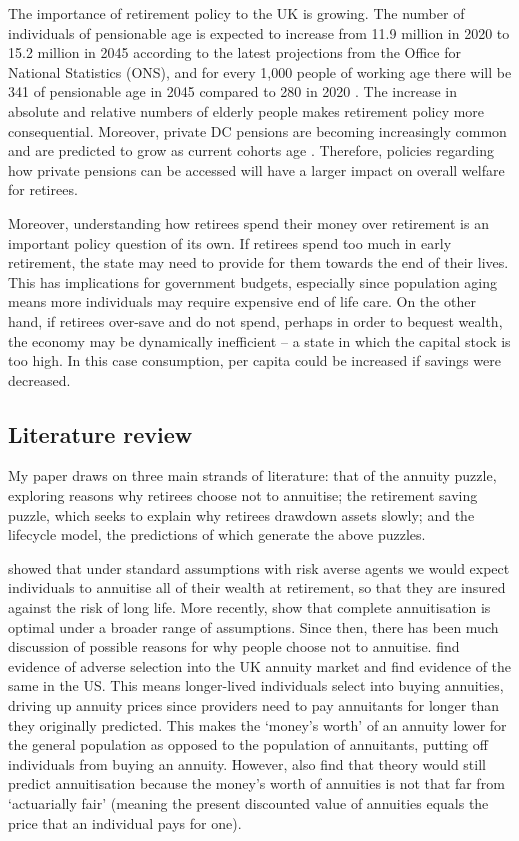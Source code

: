 \documentclass[12pt]{article}
\begin{document}
The importance of retirement policy to the UK is growing. The
number of individuals of pensionable age is expected to increase from 11.9
million in 2020 to 15.2 million in 2045 according to the latest projections from
the Office for National Statistics (ONS), and for every 1,000 people of working
age there will be 341 of pensionable age in 2045 compared to 280 in 2020
\citep{ons_population_predictions_2020}. The increase in absolute and relative
numbers of elderly people makes retirement policy more consequential. Moreover,
private DC pensions are becoming increasingly common and are predicted to grow
as current cohorts age \citep{cribb_karjalainen_ifs_2023}. Therefore, policies
regarding how private pensions can be accessed will have a larger impact on
overall welfare for retirees.

Moreover, understanding how retirees spend their money over retirement is an
important policy question of its own. If retirees spend too much in early
retirement, the state may need to provide for them towards the end of their
lives. This has implications for government budgets, especially since population
aging means more individuals may require expensive end of life care. On the
other hand, if retirees over-save and do not spend, perhaps in order to bequest
wealth, the economy may be dynamically inefficient -- a state in which the
capital stock is too high. In this case consumption, per capita could be
increased if savings were decreased.


\subsection{Literature review}
My paper draws on three main strands of literature: that of the annuity puzzle,
exploring reasons why retirees choose not to annuitise; the retirement
saving puzzle, which seeks to explain why retirees drawdown assets slowly; and
the lifecycle model, the predictions of which generate the above puzzles.

\cite{yaari_65} showed that under standard assumptions with risk averse agents
we would expect individuals to annuitise all of their wealth at retirement, so
that they are insured against the risk of long life. More recently,
\cite{davidoff_brown_diamond_aer_2005} show that complete annuitisation is
optimal under a broader range of assumptions. Since then, there has been much
discussion of possible reasons for why people choose not to annuitise.
\cite{finkelstein_porteba_2002, finkelstein_porteba_2004} find evidence of
adverse selection into the UK annuity market and \cite{mitchell_et_al_1999} find
evidence of the same in the US. This means longer-lived individuals select into
buying annuities, driving up annuity prices since providers need to pay
annuitants for longer than they originally predicted. This
makes the `money's worth' of an annuity lower for the general population as
opposed to the population of annuitants, putting off individuals from buying an
annuity. However, \cite{mitchell_et_al_1999} also find that theory would still
predict annuitisation because the money's worth of annuities is not that far
from `actuarially fair' (meaning the present discounted value of annuities
equals the price that an individual pays for one).
\end{document}
